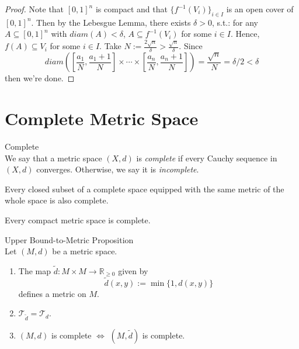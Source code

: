 \begin{proof}
    Note that $[0,1]^n$ is compact and that $\{ f^{-1} (V_i)\}_{i \in I}$ is an open cover of $[0,1]^n$. Then by the Lebesgue Lemma, there exists $\delta>0$, s.t.: for any $A \subseteq [0,1]^n$ with $diam(A) < \delta$, $A \subseteq f^{-1}(V_i)$ for some $i\in I$. Hence, $f(A) \subseteq V_i$ for some $i \in I$. Take $N:= \frac{2\sqrt{n}}{\delta} > \frac{\sqrt{n}}{\delta}$. Since
    $$diam ([\frac{a_1}{N}, \frac{a_1+1}{N}] \times \cdots \times [\frac{a_n}{N}, \frac{a_n+1}{N}]) = \frac{\sqrt{n}}{N} = \delta/2 <\delta$$
    then we're done.
\end{proof}

\section{Complete Metric Space}

\begin{definition}{Complete}\\
We say that a metric space $(X,d)$ is \textit{complete} if every Cauchy sequence in $(X,d)$ converges. Otherwise, we say it is \textit{incomplete}.
\end{definition}

\begin{proposition}
    Every closed subset of a complete space equipped with the same metric of the whole space is also complete.
\end{proposition}

\begin{proposition}
    Every compact metric space is complete.
\end{proposition}

\begin{proposition}{Upper Bound-to-Metric Proposition}\\
Let $(M,d)$ be a metric space.
\begin{enumerate}
    \item The map $\tilde{d}: M\times M \to \mathbb{R}_{\geq 0}$ given by
    $$\tilde{d} (x,y) := \min \{1, d(x,y) \}$$
    defines a metric on $M$.

    \item $\mathcal{T}_{\tilde{d}} = \mathcal{T}_d$.
    \item $(M,d)$ is complete $\Leftrightarrow$ $(M,\tilde{d})$ is complete.
\end{enumerate}
\end{proposition}

